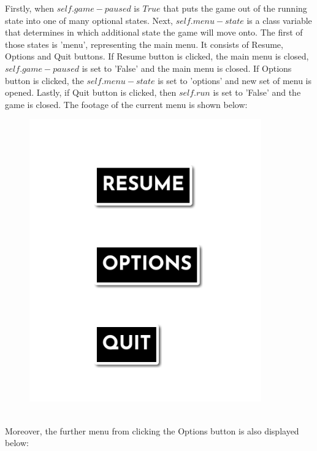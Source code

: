 \documentclass[12pt]{article}
\begin{document}
Firstly, when $self.game-paused$ is $True$ that puts the game out of the running state into one of many optional states. Next, $self.menu-state$ is a class variable that determines in which additional state the game will move onto. 
The first of those states is 'menu', representing the main menu. It consists of Resume, Options and Quit buttons. If Resume button is clicked, the main menu is closed, $self.game-paused$ is set to 'False' and the main menu is closed. If Options button is clicked, the $self.menu-state$ is set to 'options' and new set of menu is opened. Lastly, if Quit button is clicked, then $self.run$ is set to 'False' and the game is closed. The footage of the current menu is shown below:\\
\begin{figure}[H]
    \includegraphics[width = 10cm]{game class/mainmenu.png}
    \centering
\end{figure}\\
Moreover, the further menu from clicking the Options button is also displayed below:\\
\end{document}
